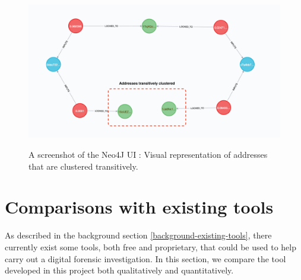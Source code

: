 \begin{figure}[h!]
  \centering
  \includegraphics[width = 15cm]{./figures/neo4j-screenshots/addresses-transitively-clustered}\\[0.5cm] 
  \caption{A screenshot of the Neo4J UI : Visual representation of addresses that are clustered transitively.}
  \label{fig:neo4j-transitive-clustering-screenshot}
\end{figure}

\section{Comparisons with existing tools}\label{evaluation:existing-tool-comp}
As described in the background section \ref{background-existing-tools}, there currently exist some tools, both free and proprietary, that could be used to help carry out a digital forensic investigation. In this section, we compare the tool developed in this project both qualitatively and quantitatively.

